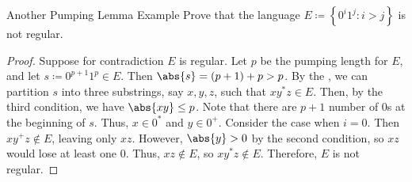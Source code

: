 \begin{exbox}{Another Pumping Lemma Example}{}
    Prove that the language $E \coloneq \left\{ 0^i 1^j : i > j \right\}$ is not regular.
    \tcblower
    \begin{proof}
        Suppose for contradiction $E$ is regular. Let $p$ be the pumping length for $E$, and let $s \coloneq 0^{p+1}1^p \in E$. Then $\abs{s} = (p+1) + p > p$. By the , we can partition $s$ into three substrings, say $x,y,z$, such that $x  y^*  z \in E$. Then, by the third condition, we have $\abs{x  y} \leq p$. Note that there are $p+1$ number of $0$s at the beginning of $s$. Thus, $x \in 0^*$ and $y \in 0^+$. Consider the case when $i = 0$. Then $x  y^+  z \notin E$, leaving only $x  z$. However, $\abs{y} > 0$ by the second condition, so $x  z$ would lose at least one $0$. Thus, $x  z \notin E$, so $x  y^*  z \notin E$. Therefore, $E$ is not regular.
    \end{proof}
\end{exbox}
